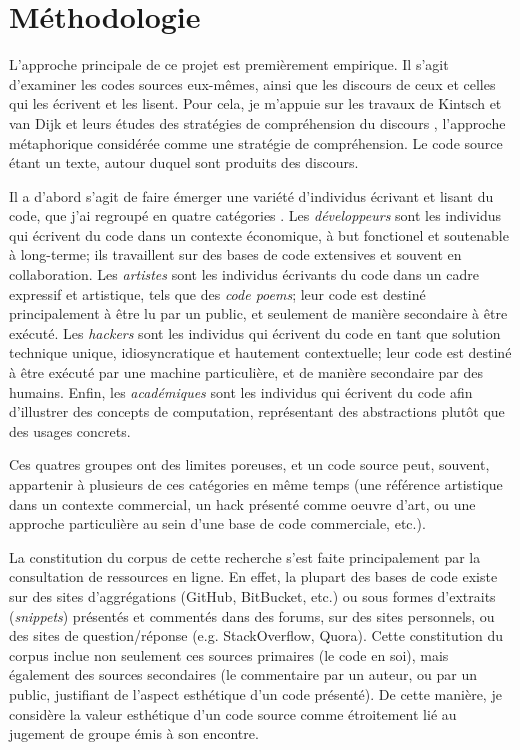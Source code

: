 \documentclass{article}
\begin{document}
\section*{Méthodologie}

L'approche principale de ce projet est premièrement empirique. Il s'agit d'examiner les codes sources eux-mêmes, ainsi que les discours de ceux et celles qui les écrivent et les lisent. Pour cela, je m'appuie sur les travaux de Kintsch et van Dijk et leurs études des stratégies de compréhension du discours \citep{kintsch_model_1978}, l'approche métaphorique considérée comme une stratégie de compréhension. Le code source étant un texte, autour duquel sont produits des discours.

Il a d'abord s'agit de faire émerger une variété d'individus écrivant et lisant du code, que j'ai regroupé en quatre catégories \citep{hayes_cultures_2015}. Les \emph{développeurs} sont les individus qui écrivent du code dans un contexte économique, à but fonctionel et soutenable à long-terme; ils travaillent sur des bases de code extensives et souvent en collaboration. Les \emph{artistes} sont les individus écrivants du code dans un cadre expressif et artistique, tels que des \emph{code poems}; leur code est destiné principalement à être lu par un public, et seulement de manière secondaire à être exécuté. Les \emph{hackers} sont les individus qui écrivent du code en tant que solution technique unique, idiosyncratique et hautement contextuelle; leur code est destiné à être exécuté par une machine particulière, et de manière secondaire par des humains. Enfin, les \emph{académiques} sont les individus qui écrivent du code afin d'illustrer des concepts de computation, représentant des abstractions plutôt que des usages concrets.

Ces quatres groupes ont des limites poreuses, et un code source peut, souvent, appartenir à plusieurs de ces catégories en même temps (une référence artistique dans un contexte commercial, un hack présenté comme oeuvre d'art, ou une approche particulière au sein d'une base de code commerciale, etc.).

La constitution du corpus de cette recherche s'est faite principalement par la consultation de ressources en ligne. En effet, la plupart des bases de code existe sur des sites d'aggrégations (GitHub, BitBucket, etc.) ou sous formes d'extraits (\emph{snippets}) présentés et commentés dans des forums, sur des sites personnels, ou des sites de question/réponse (e.g. StackOverflow, Quora). Cette constitution du corpus inclue non seulement ces sources primaires (le code en soi), mais également des sources secondaires (le commentaire par un auteur, ou par un public, justifiant de l'aspect esthétique d'un code présenté). De cette manière, je considère la valeur esthétique d'un code source comme étroitement lié au jugement de groupe émis à son encontre.
\end{document}

